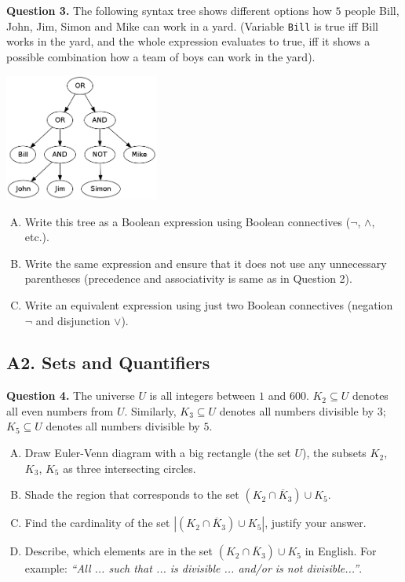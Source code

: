 \documentclass[jou]{apa6}
\begin{document}
\vspace{6pt}
{\bf Question 3.} The following syntax tree shows different options how 
$5$ people \textendash{} Bill, John, Jim, Simon and Mike \textendash{} can 
work in a yard. (Variable {\tt Bill} is true iff Bill works in the yard, 
and the whole expression evaluates to true, iff it shows a possible combination
how a team of boys can work in the yard). 
\begin{center}
\includegraphics[width=2in]{midterm/syntax-tree.png}
\end{center}
\begin{enumerate}[(A)]
\item Write this tree as a Boolean expression using 
Boolean connectives ($\neg$, $\wedge$, etc.).
\item Write the same expression and ensure that it does not 
use any unnecessary parentheses (precedence and associativity is 
same as in Question 2). 
\item Write an equivalent expression using just two Boolean 
connectives (negation $\neg$ and disjunction $\vee$). 
\end{enumerate}


\subsection{A2. Sets and Quantifiers}

{\bf Question 4.} 
The universe $U$ is all integers between $1$ and $600$. 
$K_2 \subseteq U$ denotes all even numbers from $U$.
Similarly, $K_3 \subseteq U$ denotes all numbers divisible by $3$; 
$K_5 \subseteq U$ denotes all numbers divisible by $5$. 

\begin{enumerate}[(A)]
\item Draw Euler-Venn diagram with a big rectangle (the set $U$), 
the subsets $K_2$, $K_3$, $K_5$ as three intersecting circles.
\item Shade the region that corresponds to the set
$(K_2 \cap \overline K_3) \cup K_5$. 
\item Find the cardinality of the set
$\left| (K_2 \cap \overline K_3) \cup K_5 \right|$, 
justify your answer. 
\item Describe, which elements are in the set 
$(K_2 \cap \overline K_3) \cup K_5$ in English. 
For example: {\em ``All ... such that ... is divisible ... 
and/or is not divisible...''}. 
\end{enumerate}
\end{document}
